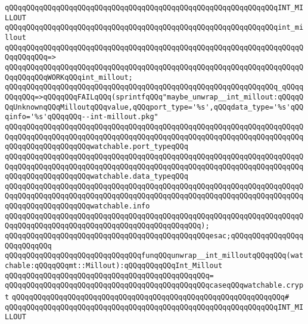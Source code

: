 \verb|qQQqqQQqqQQqqQQqqQQqqQQqqQQqqQQqqQQqqQQqqQQqqQQqqQQqqQQqqQQqqQQqINT_MILLOUT|\newline
\verb|qQQqqQQqqQQqqQQqqQQqqQQqqQQqqQQqqQQqqQQqqQQqqQQqqQQqqQQqqQQqqQQqint_millout|\newline
\verb|qQQqqQQqqQQqqQQqqQQqqQQqqQQqqQQqqQQqqQQqqQQqqQQqqQQqqQQqqQQqqQQqqQQqqQQqqQQqqQQq=>|\newline
\verb|qQQqqQQqqQQqqQQqqQQqqQQqqQQqqQQqqQQqqQQqqQQqqQQqqQQqqQQqqQQqqQQqqQQqqQQqqQQqqQQqWORKqQQqint_millout;|\newline
\newline
\verb|qQQqqQQqqQQqqQQqqQQqqQQqqQQqqQQqqQQqqQQqqQQqqQQqqQQqqQQqqQQqqQQq_qQQqqQQqqQQq=>qQQqqQQqFAILqQQq(sprintfqQQq"maybe_unwrap__int_millout:qQQqqQQqUnknownqQQqMilloutqQQqvalue,qQQqport_type='%s',qQQqdata_type='%s'qQQqinfo='%s'qQQqqQQq--int-millout.pkg"|\newline
\verb|qQQqqQQqqQQqqQQqqQQqqQQqqQQqqQQqqQQqqQQqqQQqqQQqqQQqqQQqqQQqqQQqqQQqqQQqqQQqqQQqqQQqqQQqqQQqqQQqqQQqqQQqqQQqqQQqqQQqqQQqqQQqqQQqqQQqqQQqqQQqqQQqqQQqqQQqqQQqqQQqwatchable.port_typeqQQq|\newline
\verb|qQQqqQQqqQQqqQQqqQQqqQQqqQQqqQQqqQQqqQQqqQQqqQQqqQQqqQQqqQQqqQQqqQQqqQQqqQQqqQQqqQQqqQQqqQQqqQQqqQQqqQQqqQQqqQQqqQQqqQQqqQQqqQQqqQQqqQQqqQQqqQQqqQQqqQQqqQQqqQQqwatchable.data_typeqQQq|\newline
\verb|qQQqqQQqqQQqqQQqqQQqqQQqqQQqqQQqqQQqqQQqqQQqqQQqqQQqqQQqqQQqqQQqqQQqqQQqqQQqqQQqqQQqqQQqqQQqqQQqqQQqqQQqqQQqqQQqqQQqqQQqqQQqqQQqqQQqqQQqqQQqqQQqqQQqqQQqqQQqqQQqwatchable.info|\newline
\verb|qQQqqQQqqQQqqQQqqQQqqQQqqQQqqQQqqQQqqQQqqQQqqQQqqQQqqQQqqQQqqQQqqQQqqQQqqQQqqQQqqQQqqQQqqQQqqQQqqQQqqQQqqQQqqQQqqQQq);|\newline
\verb|qQQqqQQqqQQqqQQqqQQqqQQqqQQqqQQqqQQqqQQqqQQqqQQqesac;qQQqqQQqqQQqqQQqqQQqqQQqqQQq|\newline
\newline
\verb|qQQqqQQqqQQqqQQqqQQqqQQqqQQqqQQqfunqQQqunwrap__int_milloutqQQqqQQq(watchable:qQQqqQQqmt::Millout):qQQqqQQqqQQqInt_Millout|\newline
\verb|qQQqqQQqqQQqqQQqqQQqqQQqqQQqqQQqqQQqqQQqqQQqqQQq=|\newline
\verb|qQQqqQQqqQQqqQQqqQQqqQQqqQQqqQQqqQQqqQQqqQQqqQQqcaseqQQqwatchable.crypt|\newline
\verb|qQQqqQQqqQQqqQQqqQQqqQQqqQQqqQQqqQQqqQQqqQQqqQQqqQQqqQQqqQQqqQQq#|\newline
\verb|qQQqqQQqqQQqqQQqqQQqqQQqqQQqqQQqqQQqqQQqqQQqqQQqqQQqqQQqqQQqqQQqINT_MILLOUT|\newline
